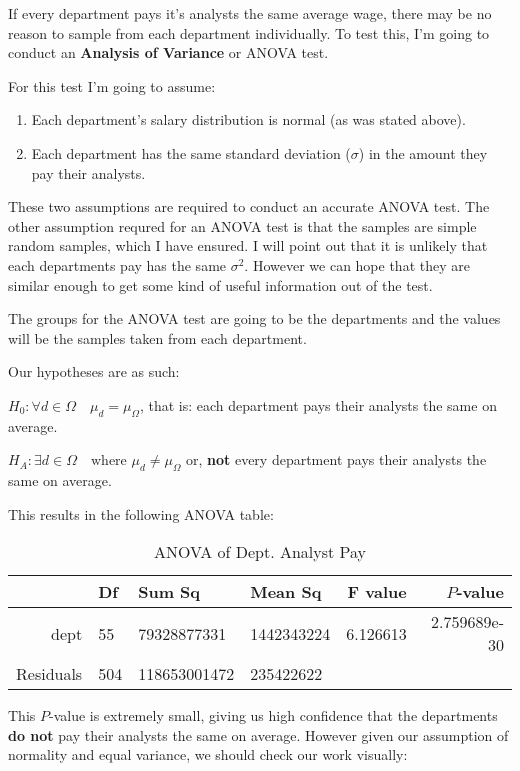 \documentclass[letterpaper]{article}
\theoremstyle{definition}
\begin{document}
If every department pays it's analysts the same average wage, there may be no reason to
sample from each department individually. To test this, I'm going to conduct an
\textbf{Analysis of Variance} or ANOVA test. 

For this test I'm going to assume: 

\begin{enumerate}
	\item Each department's salary distribution is normal (as was stated above).
	\item Each department has the same standard deviation ($\sigma$) in the amount they
		pay their analysts.
\end{enumerate}

These two assumptions are required to conduct an accurate ANOVA test. The other assumption
requred for an ANOVA test is that the samples are simple random samples, which I have
ensured. I will point out that it is unlikely that each departments pay has the same
$\sigma^2$. However we can hope that they are similar enough to get some kind of useful
information out of the test.

The groups for the ANOVA test are going to be the departments and the values will be the
samples taken from each department. 

Our hypotheses are as such:

$\displaystyle{H_0:\forall d \in \Omega \quad  \mu_{d} = \mu_{\Omega}}$, that is: each department pays their analysts the same on average.

$\displaystyle{H_{A}: \exists  d \in \Omega \quad \text{where } \mu_{d} \neq
\mu_{\Omega}}$ or, \textbf{not} every department pays their analysts the same on average.

This results in the following ANOVA table:
    

\begin{table}[h]
	\centering
	\caption{ANOVA of Dept. Analyst Pay}
	\label{tab:1}
	\begin{tabular}{r|lllrr}
	& Df & Sum Sq & Mean Sq & F value & $P$-value\\
	\hline
		dept &  55 &  79328877331 & 1442343224 & 6.126613 & 2.759689e-30\\
		Residuals & 504 & 118653001472 &  235422622 &       &           \\
	\end{tabular}
\end{table}

This $P$-value is extremely small, giving us high confidence that the departments
\textbf{do not} pay their analysts the same on average. However given our assumption of
normality and equal variance, we should check our work visually:
\end{document}
